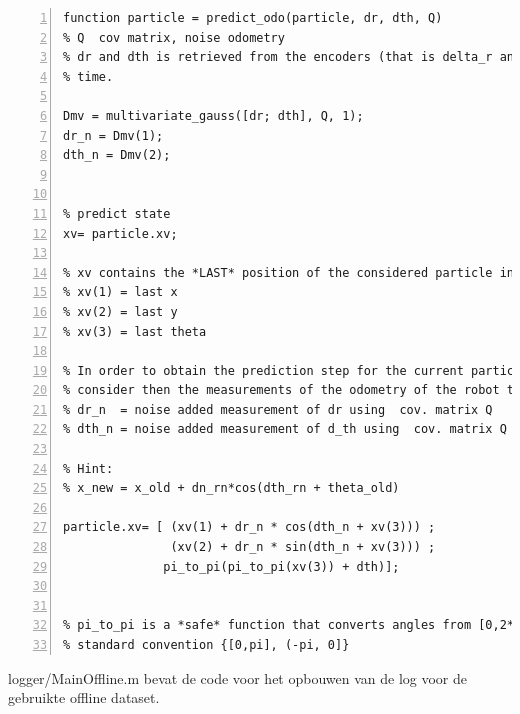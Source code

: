 \documentclass[a4paper]{article}
\begin{document}
\begin{lstlisting}[caption= predict\_odo.m, label=lst:checkconcat, numbers=left]
function particle = predict_odo(particle, dr, dth, Q)
% Q  cov matrix, noise odometry
% dr and dth is retrieved from the encoders (that is delta_r and delta_theta) in dt
% time.

Dmv = multivariate_gauss([dr; dth], Q, 1);
dr_n = Dmv(1); 
dth_n = Dmv(2);


% predict state
xv= particle.xv;

% xv contains the *LAST* position of the considered particle in world coordinate frame, such as:
% xv(1) = last x
% xv(2) = last y
% xv(3) = last theta

% In order to obtain the prediction step for the current particle 'particle'
% consider then the measurements of the odometry of the robot that are:
% dr_n  = noise added measurement of dr using  cov. matrix Q
% dth_n = noise added measurement of d_th using  cov. matrix Q

% Hint:
% x_new = x_old + dn_rn*cos(dth_rn + theta_old)

particle.xv= [ (xv(1) + dr_n * cos(dth_n + xv(3))) ; 
               (xv(2) + dr_n * sin(dth_n + xv(3))) ;
              pi_to_pi(pi_to_pi(xv(3)) + dth)];
 
 
% pi_to_pi is a *safe* function that converts angles from [0,2*pi] into the
% standard convention {[0,pi], (-pi, 0]}
\end{lstlisting}
logger/MainOffline.m bevat de code voor het opbouwen van de log voor de gebruikte offline dataset.
\end{document}
